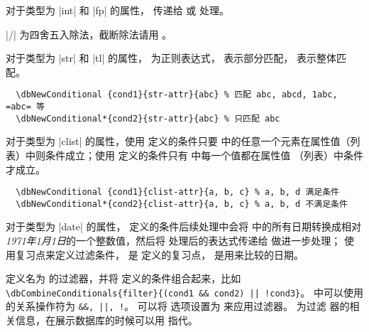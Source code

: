\documentclass[full]{l3doc}
\begin{document}
\begin{documentation}
  对于类型为 |int| 和 |fp| 的属性， 传递给  或
   处理。
  \begin{note}
    |/| 为四舍五入除法，截断除法请用 。
  \end{note}

  对于类型为 |str| 和 |tl| 的属性， 为正则表达式，
   表示部分匹配， 表示整体匹配。

\begin{verbatim}
  \dbNewConditional {cond1}{str-attr}{abc} % 匹配 abc, abcd, 1abc, =abc= 等
  \dbNewConditional*{cond2}{str-attr}{abc} % 只匹配 abc
\end{verbatim}

  对于类型为 |clist| 的属性，使用  定义的条件只要
   中的任意一个元素在属性值（列表）中则条件成立；使用
   定义的条件只有  中每一个值都在属性值
  （列表）中条件才成立。

\begin{verbatim}
  \dbNewConditional {cond1}{clist-attr}{a, b, c} % a, b, d 满足条件
  \dbNewConditional*{cond2}{clist-attr}{a, b, c} % a, b, d 不满足条件
\end{verbatim}

  对于类型为 |date| 的属性， 定义的条件后续处理中会将
   中的所有日期转换成相对\textit{1971年1月1日}的一个整数值，然后将
  处理后的表达式传递给  做进一步处理；
   使用复习点来定义过滤条件， 是
   定义的复习点， 是用来比较的日期。

\begin{function}[added=2022-01-05]{\dbCombineConditionals}
  \begin{syntax}
       
  \end{syntax}

   定义名为  的过滤器，并将
   定义的条件组合起来，比如
  \verb=\dbCombineConditionals{filter}{(cond1 && cond2) || !cond3}=。
   中可以使用的关系操作符为 \verb=&&, ||, !=。
  可以将  选项设置为  来应用过滤器。 为过滤
  器的相关信息，在展示数据库的时候可以用  指代。
\end{function}


\end{documentation}
\end{document}
